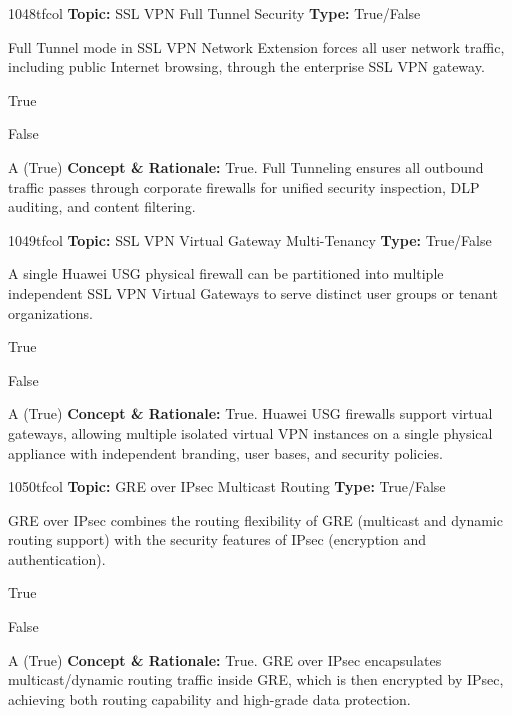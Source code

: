 \begin{qcard}{1048}{tfcol}
\textcolor{darkslate!75}{\small\textbf{Topic:} SSL VPN Full Tunnel Security \hfill \textbf{Type:} True/False}\vspace{0.4em}\par
Full Tunnel mode in SSL VPN Network Extension forces all user network traffic, including public Internet browsing, through the enterprise SSL VPN gateway.
\begin{qoptions}
\item True
\item False
\end{qoptions}
\end{qcard}
\nopagebreak
\begin{explainbox}{A (True)}
\textbf{Concept \& Rationale:} True. Full Tunneling ensures all outbound traffic passes through corporate firewalls for unified security inspection, DLP auditing, and content filtering.
\end{explainbox}

\begin{qcard}{1049}{tfcol}
\textcolor{darkslate!75}{\small\textbf{Topic:} SSL VPN Virtual Gateway Multi-Tenancy \hfill \textbf{Type:} True/False}\vspace{0.4em}\par
A single Huawei USG physical firewall can be partitioned into multiple independent SSL VPN Virtual Gateways to serve distinct user groups or tenant organizations.
\begin{qoptions}
\item True
\item False
\end{qoptions}
\end{qcard}
\nopagebreak
\begin{explainbox}{A (True)}
\textbf{Concept \& Rationale:} True. Huawei USG firewalls support virtual gateways, allowing multiple isolated virtual VPN instances on a single physical appliance with independent branding, user bases, and security policies.
\end{explainbox}

\begin{qcard}{1050}{tfcol}
\textcolor{darkslate!75}{\small\textbf{Topic:} GRE over IPsec Multicast Routing \hfill \textbf{Type:} True/False}\vspace{0.4em}\par
GRE over IPsec combines the routing flexibility of GRE (multicast and dynamic routing support) with the security features of IPsec (encryption and authentication).
\begin{qoptions}
\item True
\item False
\end{qoptions}
\end{qcard}
\nopagebreak
\begin{explainbox}{A (True)}
\textbf{Concept \& Rationale:} True. GRE over IPsec encapsulates multicast/dynamic routing traffic inside GRE, which is then encrypted by IPsec, achieving both routing capability and high-grade data protection.
\end{explainbox}
